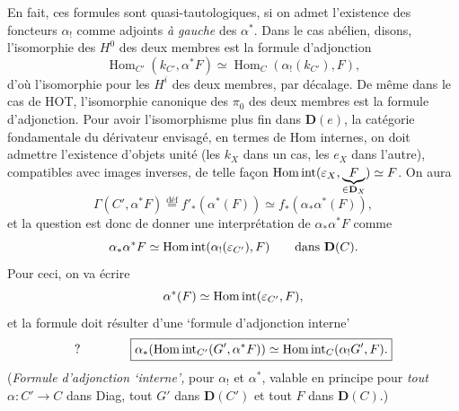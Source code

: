 En fait, ces formules sont quasi-tautologiques, si on admet l'existence des foncteurs $\alpha_!$ comme adjoints \textit{à gauche} des $\alpha^*$. Dans le cas abélien, disons,
l'isomorphie des $H^0$ des deux membres est la formule d'adjonction
\[ \operatorname{Hom}_{C'}(k_{C'}, \alpha^*F) \simeq \operatorname{Hom}_C(\alpha_!(k_{C'}), F), \]
d'où l'isomorphie pour les $H^i$ des deux membres, par décalage. De même dans le cas de HOT, l'isomorphie canonique des $\pi_0$ des deux membres est la formule d'adjonction. Pour avoir l'isomorphisme plus fin dans $\mathbf{D}(e)$, la catégorie fondamentale du dérivateur envisagé, en termes de Hom internes, on doit admettre l'existence d'objets unité (les $k_X$ dans un cas, les $e_X$ dans l'autre), compatibles avec images inverses, de telle façon $\operatorname{Hom\,int}(\varepsilon_X, \underbrace{F}_{\in\mathbf{D}_X}) \simeq F$. On aura
\[ \Gamma(C', \alpha^*F) \overset{\text{déf}}{=} f'_*(\alpha^*(F)) \simeq f_*(\alpha_*\alpha^*(F)), \]
et la question est donc de donner une interprétation de $\alpha_*\alpha^*F$ comme
\[ \alpha_*\alpha^*F \simeq \operatorname{Hom\,int}(\alpha_!(\varepsilon_{C'}), F) \qquad \text{dans } \mathbf{D}(C). \]
Pour ceci, on va écrire
\[ \alpha^*(F) \simeq \operatorname{Hom\,int}(\varepsilon_{C'}, F), \]
et la formule doit résulter d'une `formule d'adjonction interne'
\[ ? \qquad\qquad \boxed{\alpha_*(\operatorname{Hom\,int}_{C'}(G', \alpha^*F)) \simeq \operatorname{Hom\,int}_C(\alpha_!G', F).} \]
(\textit{Formule d'adjonction `interne',} pour $\alpha_!$ et $\alpha^*$, valable en principe pour \textit{tout} $\alpha : C' \longrightarrow C$ dans Diag, tout $G'$ dans $\mathbf{D}(C')$ et tout $F$ dans $\mathbf{D}(C)$.)

